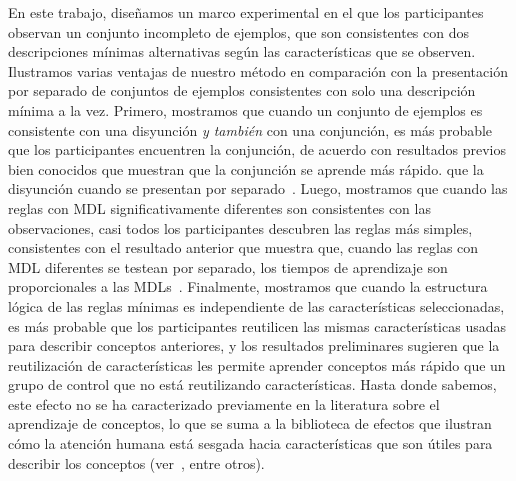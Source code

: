 En este trabajo, diseñamos un marco experimental en el que los participantes observan un conjunto incompleto de ejemplos, que son consistentes con dos descripciones mínimas alternativas según las características que se observen. Ilustramos varias ventajas de nuestro método en comparación con la presentación por separado de conjuntos de ejemplos consistentes con solo una descripción mínima a la vez. Primero, mostramos que cuando un conjunto de ejemplos es consistente con una disyunción \textit{y también} con una conjunción, es más probable que los participantes encuentren la conjunción, de acuerdo con resultados previos bien conocidos que muestran que la conjunción se aprende más rápido. que la disyunción cuando se presentan por separado~\cite{bourne1970knowing}. Luego, mostramos que cuando las reglas con MDL significativamente diferentes son consistentes con las observaciones, casi todos los participantes descubren las reglas más simples, consistentes con el resultado anterior que muestra que, cuando las reglas con MDL diferentes se testean por separado, los tiempos de aprendizaje son proporcionales a las MDLs~\cite{feldman2000minimization}. Finalmente, mostramos que cuando la estructura lógica de las reglas mínimas es independiente de las características seleccionadas, es más probable que los participantes reutilicen las mismas características usadas para describir conceptos anteriores, y los resultados preliminares sugieren que la reutilización de características les permite aprender conceptos más rápido que un grupo de control que no está reutilizando características. Hasta donde sabemos, este efecto no se ha caracterizado previamente en la literatura sobre el aprendizaje de conceptos, lo que se suma a la biblioteca de efectos que ilustran cómo la atención humana está sesgada hacia características que son útiles para describir los conceptos (ver~\cite{blair2009extremely, kruschke2000blocking, kruschke2005eye, hoffman2010costs}, entre otros).


